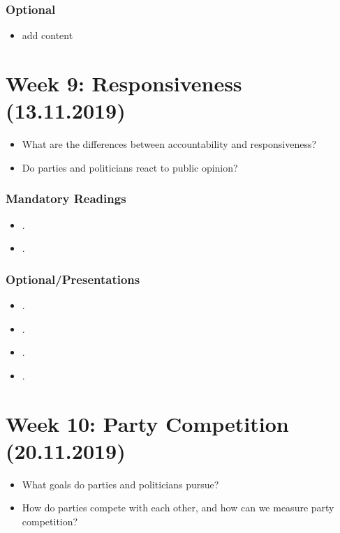 \documentclass[abstract=on,parskip=full,headings=standardclasses,fontsize=11pt,paper=a4]{scrartcl}
\begin{document}
\subsubsection*{Optional}
\begin{itemize}
\item add content
\end{itemize}



\section{Week 9:  Responsiveness (13.11.2019)}



\begin{itemize}
\renewcommand\labelitemi{--}
\item What are the differences between accountability and responsiveness?
\item Do parties and politicians react to public opinion? 
\end{itemize}

\subsubsection*{Mandatory Readings}
\begin{itemize}
\item {}.
\item {}.
\end{itemize}

\subsubsection*{Optional/Presentations}
\begin{itemize}
\item {}.
\item {}.
\item {}.
\item {}.
\end{itemize}


\section{Week 10:  Party Competition (20.11.2019)}

\begin{itemize}
\renewcommand\labelitemi{--}
\item What goals do parties and politicians pursue?
\item How do parties compete with each other, and how can we measure party competition?
\end{itemize}
\end{document}
